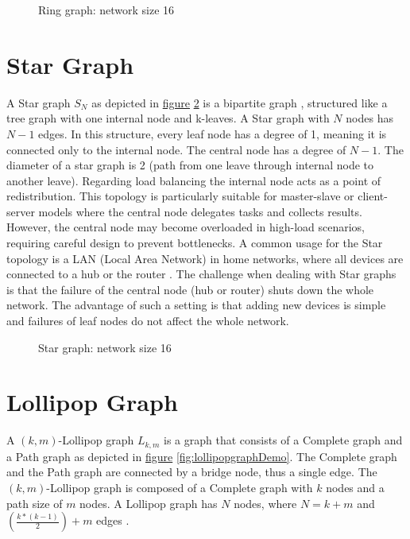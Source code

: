 \begin{figure}[H]
    \centering
    \scalebox{0.8}{}
    \caption{Ring graph: network size 16}
    \label{fig:ring}
\end{figure}

\section{Star Graph}\label{sec:2stargraph}
A Star graph $S_N$ as depicted in \hyperref[fig:stargraphDemo]{figure} \ref{fig:stargraphDemo} is a bipartite graph \cite{west2001introduction}, structured like a tree graph with one internal node and k-leaves. A Star graph with $N$ nodes has $N-1$ edges. In this structure, every leaf node has a degree of 1, meaning it is connected only to the internal node. The central node has a degree of $N-1$. The diameter of a star graph is 2 (path from one leave through internal node to another leave). Regarding load balancing the internal node acts as a point of redistribution. This topology is particularly suitable for master-slave or client-server models where the central node delegates tasks and collects results. However, the central node may become overloaded in high-load scenarios, requiring careful design to prevent bottlenecks. A common usage for the Star topology is a LAN (Local Area Network) in home networks, where all devices are connected to a hub or the router \cite{Jayeola2023}. The challenge when dealing with Star graphs is that the failure of the central node (hub or router) shuts down the whole network. The advantage of such a setting is that adding new devices is simple and failures of leaf nodes do not affect the whole network.

\begin{figure}[H]
    \centering
    
    \caption{Star graph: network size 16}
    \label{fig:stargraphDemo}
\end{figure}


\section{Lollipop Graph}\label{sec:2lollipopgraph}
A $(k, m)$-Lollipop graph $L_{k,m}$ is a graph that consists of a Complete graph and a Path graph as depicted in \hyperref[fig:lollipopgraphDemo]{figure} \ref{fig:lollipopgraphDemo}. The Complete graph and the Path graph are connected by a bridge node, thus a single edge. The $(k, m)$-Lollipop graph is composed of a Complete graph with $k$ nodes and a path size of $m$ nodes. A Lollipop graph has $N$ nodes, where $N = k+m$ and $(\frac{k*(k-1)}{2})+m$ edges \cite{JonassonLollipopGraphs2000}.

